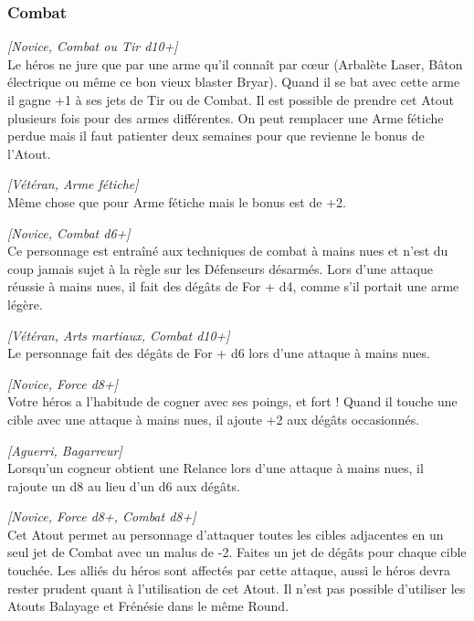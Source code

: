 \subsubsection{Combat}
\begin{description}[align=left]
    \item [Arme fétiche]
    	\emph{[Novice, Combat ou Tir d10+]}\\
        Le héros ne jure que par une arme qu’il connaît par c\oe{ur} (Arbalète Laser, Bâton électrique ou même ce bon vieux blaster Bryar). Quand il se bat avec cette arme il gagne +1 à ses jets de Tir ou de Combat. Il est possible de prendre cet Atout plusieurs fois pour des armes différentes. On peut remplacer une Arme fétiche perdue mais il faut patienter deux semaines pour que revienne le bonus de l’Atout.

    \item [Arme fétiche adorée]
    	\emph{[Vétéran, Arme fétiche]}\\
        Même chose que pour Arme fétiche mais le bonus est de +2.

    \item [Arts martiaux]
    	\emph{[Novice, Combat d6+]}\\
        Ce personnage est entraîné aux techniques de combat à mains nues et n’est du coup jamais sujet à la règle sur les Défenseurs désarmés. Lors d’une attaque réussie à mains nues, il fait des dégâts de For + d4, comme s’il portait une arme légère.

    \item [Maître des arts martiaux]
    	\emph{[Vétéran, Arts martiaux, Combat d10+]}\\
        Le personnage fait des dégâts de For + d6 lors d’une attaque à mains nues.

    \item [Bagarreur]
    	\emph{[Novice, Force d8+]}\\
        Votre héros a l’habitude de cogner avec ses poings, et fort ! Quand il touche une cible avec une attaque à mains nues, il ajoute +2 aux dégâts occasionnés.

    \item [Cogneur]
    	\emph{[Aguerri, Bagarreur]}\\
        Lorsqu’un cogneur obtient une Relance lors d’une attaque à mains nues, il rajoute un d8 au lieu d’un d6 aux dégâts.

    \item [Balayage]
    	\emph{[Novice, Force d8+, Combat d8+]}\\
        Cet Atout permet au personnage d’attaquer toutes les cibles adjacentes en un seul jet de Combat avec un malus de -2. Faites un jet de dégâts pour chaque cible touchée. Les alliés du héros sont affectés par cette attaque, aussi le héros devra rester prudent quant à l’utilisation de cet Atout. Il n’est pas possible d’utiliser les Atouts Balayage et Frénésie dans le même Round.


\end{description}
